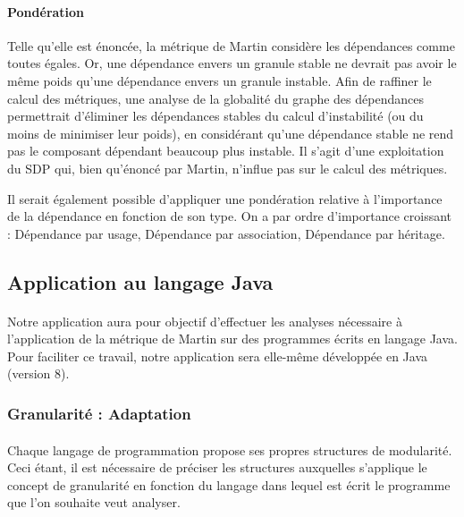 \documentclass{scrartcl}
\begin{document}
    \paragraph{Pondération}Telle qu'elle est énoncée, la métrique de Martin considère les dépendances comme toutes égales. Or, une dépendance envers un granule stable ne devrait pas avoir le même poids qu'une dépendance envers un granule instable. Afin de raffiner le calcul des métriques, une analyse de la globalité du graphe des dépendances permettrait d'éliminer les dépendances stables du calcul d'instabilité (ou du moins de minimiser leur poids), en considérant qu'une dépendance stable ne rend pas le composant dépendant beaucoup plus instable. Il s'agit d'une exploitation du SDP qui, bien qu'énoncé par Martin, n'influe pas sur le calcul des métriques.
    
    Il serait également possible d'appliquer une pondération relative à l'importance de la dépendance en fonction de son type. On a par ordre d'importance croissant : Dépendance par usage, Dépendance par association, Dépendance par héritage. 


\subsection{Application au langage Java}

    \paragraph{}Notre application aura pour objectif d'effectuer les analyses nécessaire à l'application de la métrique de Martin sur des programmes écrits en langage Java. Pour faciliter ce travail, notre application sera elle-même développée en Java (version 8).

\subsubsection{Granularité : Adaptation}
    
    \paragraph{}Chaque langage de programmation propose ses propres structures de modularité. Ceci étant, il est nécessaire de préciser les structures auxquelles s'applique le concept de granularité en fonction du langage dans lequel est écrit le programme que l'on souhaite veut analyser.
    
\end{document}
